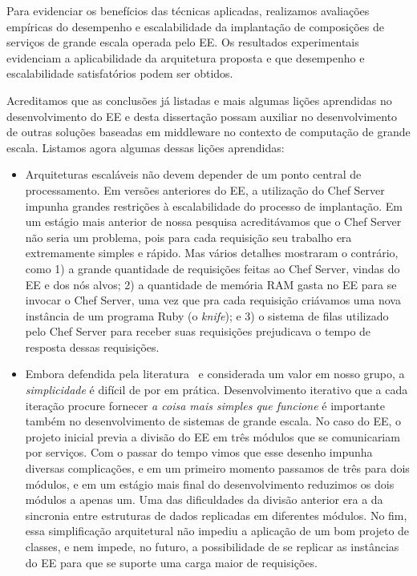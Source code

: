 Para evidenciar os benefícios das técnicas aplicadas,
realizamos avaliações empíricas do desempenho e escalabilidade
da implantação de composições de serviços de grande escala
operada pelo EE.
Os resultados experimentais evidenciam a aplicabilidade da arquitetura proposta
e que desempenho e escalabilidade satisfatórios podem ser obtidos.

Acreditamos que as conclusões já listadas e mais algumas lições aprendidas
no desenvolvimento do EE e desta dissertação
possam auxiliar no desenvolvimento de outras soluções baseadas
em middleware no contexto de computação de grande escala.
Listamos agora algumas dessas lições aprendidas:

\begin{itemize}

\item Arquiteturas escaláveis não devem depender de um ponto central de processamento.
Em versões anteriores do EE, a utilização do Chef Server impunha grandes
restrições à escalabilidade do processo de implantação.
Em um estágio mais anterior de nossa pesquisa acreditávamos que o Chef Server
não seria um problema, pois para cada requisição seu trabalho era extremamente simples
e rápido. Mas vários detalhes mostraram o contrário, como 1) a grande
quantidade de requisições feitas ao Chef Server, vindas do EE e dos nós alvos;
2) a quantidade de memória RAM gasta no EE para se invocar o Chef Server,
uma vez que pra cada requisição criávamos uma nova instância de um programa
Ruby (o \emph{knife}); e 3) o sistema de filas utilizado pelo Chef Server
para receber suas requisições prejudicava o tempo de resposta dessas requisições.

\item Embora defendida pela literatura~\cite{Hamilton2007InternetScale}
e considerada um valor em nosso grupo,
a \emph{simplicidade} é difícil de por em prática.
Desenvolvimento iterativo que a cada iteração procure fornecer \emph{a coisa mais simples que funcione}
é importante também no desenvolvimento de sistemas de grande escala.
No caso do EE, o projeto inicial previa a divisão do EE em três módulos
que se comunicariam por serviços. Com o passar do tempo vimos que esse desenho
impunha diversas complicações, e em um primeiro momento passamos de três para dois
módulos, e em um estágio mais final do desenvolvimento reduzimos os dois módulos
a apenas um. Uma das dificuldades da divisão anterior era a da sincronia
entre estruturas de dados replicadas em diferentes módulos.
No fim, essa simplificação arquitetural não impediu a aplicação de um bom projeto
de classes, e nem impede, no futuro, a possibilidade de se replicar as instâncias
do EE para que se suporte uma carga maior de requisições.

\end{itemize}


